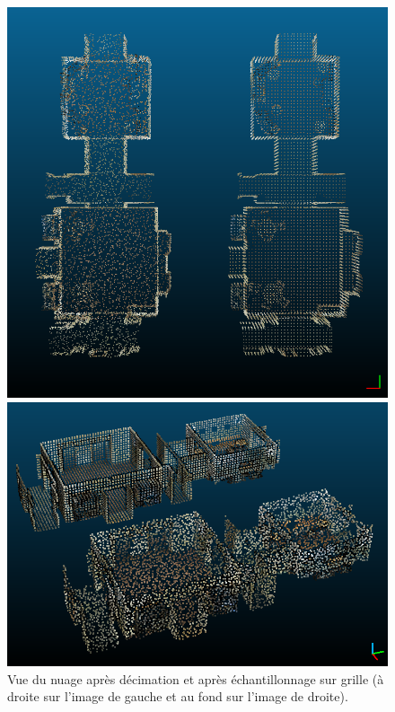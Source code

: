 \documentclass[french]{article}
\begin{document}
\begin{figure}[h]
	\centering
	\begin{minipage}{0.47\linewidth}
		\centering
		\includegraphics[width=\linewidth]{q5-1.png}
	\end{minipage}\hfill
	\begin{minipage}{0.47\linewidth}
		\centering
		\includegraphics[width=\linewidth]{q5-2.png}
	\end{minipage}
	\caption{Vue du nuage après décimation et après échantillonnage sur grille (à droite sur l'image de gauche et au fond sur l'image de droite).}
	\label{fig:q5}
\end{figure}
\end{document}
